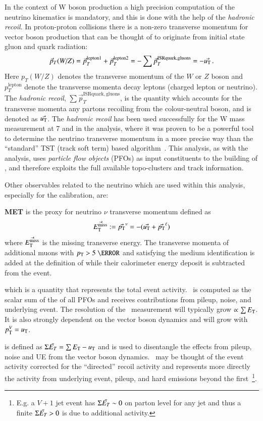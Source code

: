 In the context of W boson production a high precision computation of the neutrino kinematics is mandatory, and this is done with the help of the \textit{hadronic recoil}. In proton-proton collisions there is a non-zero transverse momentum for vector boson production that can be thought of to originate from initial state gluon and quark radiation:
\begin{equation}
\vec{p}_{T}(W/Z)=\vec{p}_{T}^{\mathrm{lepton1}}+\vec{p}_{T}^{\mathrm{lepton2}}=-\sum \vec{p}_{T}^{\mathrm{ISR quark,gluons}} = -\vec{u_\mathrm{T}} \,.
\end{equation}
Here $p_{T}(W/Z)$ denotes the transverse momentum of the $W$ or $Z$ boson and $p_{T}^{\mathrm{lepton}}$ denote the transverse momenta decay leptons (charged lepton or neutrino). The  \textit{hadronic recoil}, $\sum \vec{p}_{T}^{\mathrm{ISR quark,gluons}}$,  is the quantity which accounts for the transverse momenta any partons recoiling from the colour-neutral boson, and is denoted as $\vec{u_\mathrm{T}}$.
The  \textit{hadronic recoil} has been used successfully for the W mass measurement at 7 \TeV and in the \ptw analysis, where it was proven to be a powerful tool to determine the neutrino transverse momentum in a more precise way than the ``standard'' TST (track soft term) based algorithm~\cite{STDM-2014-18}. This analysis, as with the \ptw analysis, uses \emph{particle flow objects} (PFOs) as input constituents to the building of \ut, and therefore exploits the full available topo-clusters and track information. 

Other observables related to the neutrino which are used within this analysis, especially for the calibration, are:

\textbf{MET} is the proxy for neutrino $\nu$ transverse momentum defined as 
\begin{equation}\label{eq:METandNeutrino}
\vec{E_{\text{T}}^{\text{miss}}} :=\vec{p_{\text{T}}}^{\nu}=-(\vec{u_\mathrm{T}}+\vec{p_{\text{T}}}^\ell)
\end{equation}
where $\vec{E_{\text{T}}^{\text{miss}}}$ is the missing transverse energy. The transverse momenta of additional muons with $\pT>5~\GeV$ and satisfying the medium identification is added at the definition of \MET{} while their calorimeter energy deposit is subtracted from the event.

\textbf{\set} which is a quantity that represents the total event activity. \set\ is computed as the scalar sum of the \pt of all
PFOs and receives contributions from pileup, noise, and
underlying event. The resolution of the \ut\ measurement will typically grow
$\propto \sum E_\mathrm{T}$. It is also strongly dependent on the vector
boson dynamics and will grow with $p_{\text{T}}^V=u_\mathrm{T}$. 

\textbf{\setue} is defined as $\Sigma \bar{E_T}  = \sum E_\mathrm{T} - u_\mathrm{T}$ and is used to disentangle the effects from pileup, noise and UE from the vector boson dynamics. \setue\ may be thought of the event activity corrected for the ``directed'' recoil activity and represents more
directly the activity from underlying event, pileup, and hard
emissions beyond the first~\footnote{E.g. a $V+1$ jet event has
  $\Sigma \bar{E_T}  \sim 0$ on parton level for any jet \pt and thus a finite
  $\Sigma \bar{E_T}  > 0$ is due to additional activity.}.




